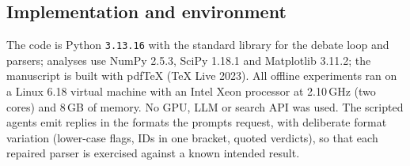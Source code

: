 \subsection{Implementation and environment}
The code is Python \texttt{3.13.16} with the standard library for the debate loop and parsers; analyses use NumPy 2.5.3, SciPy 1.18.1 and Matplotlib 3.11.2; the manuscript is built with pdfTeX (TeX Live 2023). All offline experiments ran on a Linux 6.18 virtual machine with an Intel Xeon processor at 2.10\,GHz (two cores) and 8\,GB of memory. No GPU, LLM or search API was used. The scripted agents emit replies in the formats the prompts request, with deliberate format variation (lower-case flags, IDs in one bracket, quoted verdicts), so that each repaired parser is exercised against a known intended result.
